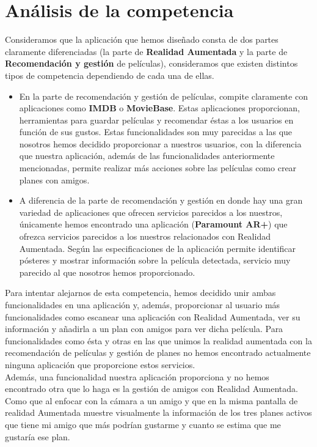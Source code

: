 \section{Análisis de la competencia}
\label{makereference2.2}
\begin{flushleft}
    Consideramos que la aplicación que hemos diseñado consta de dos partes claramente diferenciadas (la parte de \textbf{Realidad Aumentada} 
    y la parte de \textbf{Recomendación y gestión} de películas), consideramos que existen distintos tipos de competencia dependiendo de cada una de ellas.
     \begin{itemize}  
         \item En la parte de recomendación y gestión de películas, compite claramente con aplicaciones como \textbf{IMDB} o \textbf{MovieBase}. 
         Estas aplicaciones proporcionan, herramientas para guardar películas y recomendar éstas a los usuarios en función de sus gustos. Estas funcionalidades son 
         muy parecidas a las que nosotros hemos decidido proporcionar a nuestros usuarios, con la diferencia que nuestra aplicación, además de las funcionalidades anteriormente 
         mencionadas, permite realizar más acciones sobre las películas como crear planes con amigos.
        \item A diferencia de la parte de recomendación y gestión en donde hay una gran variedad de aplicaciones que ofrecen servicios parecidos a los nuestros, únicamente hemos 
        encontrado una aplicación (\textbf{Paramount AR+}) que ofrezca servicios parecidos a los nuestros relacionados con Realidad Aumentada. Según las especificaciones de la aplicación permite identificar pósteres y 
        mostrar información sobre la película detectada, servicio muy parecido al que nosotros hemos proporcionado. 
    \end{itemize}
    Para intentar alejarnos de esta competencia, hemos decidido unir ambas funcionalidades en una aplicación y, además, proporcionar al usuario más funcionalidades como escanear una aplicación con Realidad Aumentada, 
    ver su información y añadirla a un plan con amigos para ver dicha película. Para funcionalidades como ésta y otras en las que unimos la realidad aumentada con la recomendación de películas y gestión de planes no hemos encontrado actualmente ninguna aplicación que proporcione estos servicios.
    \\
    Además, una funcionalidad nuestra aplicación proporciona y no hemos encontrado otra que lo haga es la gestión de amigos con Realidad Aumentada. 
    Como que al enfocar con la cámara a un amigo y que en la misma pantalla de realidad Aumentada muestre visualmente la información de los tres planes activos que tiene mi amigo que más podrían gustarme y cuanto se estima que me gustaría ese plan.

\end{flushleft}
